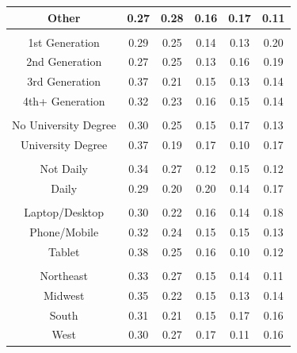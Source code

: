 \begin{table}[t]
\begin{tabular*}{\linewidth}{@{\extracolsep{\fill}}cccccc}
Other & 0.27 & 0.28 & 0.16 & 0.17 & 0.11 \\ 
\midrule\addlinespace[2.5pt]
\multicolumn{6}{l}{Generation} \\[2.5pt] 
\midrule\addlinespace[2.5pt]
1st Generation & 0.29 & 0.25 & 0.14 & 0.13 & 0.20 \\ 
2nd Generation & 0.27 & 0.25 & 0.13 & 0.16 & 0.19 \\ 
3rd Generation & 0.37 & 0.21 & 0.15 & 0.13 & 0.14 \\ 
4th+ Generation & 0.32 & 0.23 & 0.16 & 0.15 & 0.14 \\ 
\midrule\addlinespace[2.5pt]
\multicolumn{6}{l}{University Status} \\[2.5pt] 
\midrule\addlinespace[2.5pt]
No University Degree & 0.30 & 0.25 & 0.15 & 0.17 & 0.13 \\ 
University Degree & 0.37 & 0.19 & 0.17 & 0.10 & 0.17 \\ 
\midrule\addlinespace[2.5pt]
\multicolumn{6}{l}{News Consumption} \\[2.5pt] 
\midrule\addlinespace[2.5pt]
Not Daily & 0.34 & 0.27 & 0.12 & 0.15 & 0.12 \\ 
Daily & 0.29 & 0.20 & 0.20 & 0.14 & 0.17 \\ 
\midrule\addlinespace[2.5pt]
\multicolumn{6}{l}{Device} \\[2.5pt] 
\midrule\addlinespace[2.5pt]
Laptop/Desktop & 0.30 & 0.22 & 0.16 & 0.14 & 0.18 \\ 
Phone/Mobile & 0.32 & 0.24 & 0.15 & 0.15 & 0.13 \\ 
Tablet & 0.38 & 0.25 & 0.16 & 0.10 & 0.12 \\ 
\midrule\addlinespace[2.5pt]
\multicolumn{6}{l}{Region} \\[2.5pt] 
\midrule\addlinespace[2.5pt]
Northeast & 0.33 & 0.27 & 0.15 & 0.14 & 0.11 \\ 
Midwest & 0.35 & 0.22 & 0.15 & 0.13 & 0.14 \\ 
South & 0.31 & 0.21 & 0.15 & 0.17 & 0.16 \\ 
West & 0.30 & 0.27 & 0.17 & 0.11 & 0.16 \\ 
\bottomrule
\end{tabular*}
\end{table}

